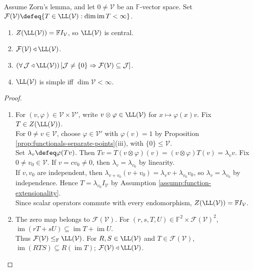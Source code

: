 \begin{theorem} \label{thm:endomorphism-algebra-center-ideals-simple} \\
Assume Zorn's lemma, and let $0\neq\mathcal{V}$ be an $\mathbb{F}$-vector space. Set $\mathcal{F}(\mathcal{V})\defeq\{T\in\LL(\mathcal{V}):\dim\operatorname{im}T<\infty\}$.
\begin{enumerate}[label=(\roman*)]
\setlength{\itemsep}{0pt}
\item $Z(\LL(\mathcal{V}))=\mathbb{F}I_{\mathcal{V}}$, so $\LL(\mathcal{V})$ is central.
\item $\mathcal{F}(\mathcal{V})\triangleleft\LL(\mathcal{V})$.
\item $(\forall\,\mathcal{J}\triangleleft\LL(\mathcal{V}))\,[\mathcal{J}\neq\{0\}\Rightarrow\mathcal{F}(\mathcal{V})\subseteq\mathcal{J}]$.
\item $\LL(\mathcal{V})$ is simple iff $\dim\mathcal{V}<\infty$.
\end{enumerate}
\begin{proof}
\begin{enumerate}[label=(\roman*)]
\setlength{\itemsep}{0pt}
\item[$(i)$] For $(v,\varphi)\in\mathcal{V}\times\mathcal{V}'$, write $v\otimes\varphi\in\LL(\mathcal{V})$ for $x\mapsto\varphi(x)v$. Fix $T\in Z(\LL(\mathcal{V}))$.\\
For $0\neq v\in\mathcal{V}$, choose $\varphi\in\mathcal{V}'$ with $\varphi(v)=1$ by Proposition \ref{prop:functionals-separate-points}(iii), with $\{0\}\leq\mathcal{V}$.\\
Set $\lambda_v\defeq\varphi(Tv)$. Then $Tv=T(v\otimes\varphi)(v)=(v\otimes\varphi)T(v)=\lambda_vv$. Fix $0\neq v_0\in\mathcal{V}$. If $v=cv_0\neq0$, then $\lambda_v=\lambda_{v_0}$ by linearity.\\
If $v,v_0$ are independent, then $\lambda_{v+v_0}(v+v_0)=\lambda_vv+\lambda_{v_0}v_0$, so $\lambda_v=\lambda_{v_0}$ by independence. Hence $T=\lambda_{v_0}I_{\mathcal{V}}$ by Assumption \ref{assump:function-extensionality}.\\
Since scalar operators commute with every endomorphism, $Z(\LL(\mathcal{V}))=\mathbb{F}I_{\mathcal{V}}$.
\item[$(ii)$] The zero map belongs to $\mathcal{F}(\mathcal{V})$. For $(r,s,T,U)\in\mathbb{F}^2\times\mathcal{F}(\mathcal{V})^2$, $\operatorname{im}(rT+sU)\subseteq\operatorname{im}T+\operatorname{im}U$.\\
Thus $\mathcal{F}(\mathcal{V})\leq_{\mathbb{F}}\LL(\mathcal{V})$. For $R,S\in\LL(\mathcal{V})$ and $T\in\mathcal{F}(\mathcal{V})$, $\operatorname{im}(RTS)\subseteq R(\operatorname{im}T)$; $\mathcal{F}(\mathcal{V})\triangleleft\LL(\mathcal{V})$.

\end{enumerate}
\end{proof}
\end{theorem}
